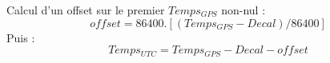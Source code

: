   Calcul d'un offset sur le premier $Temps_{GPS}$ non-nul :
\[
offset = 86400 . [(Temps_{GPS}-Decal) / 86400]
\]
Puis :
\[
   Temps_{UTC} = Temps_{GPS} - Decal - offset
\]
